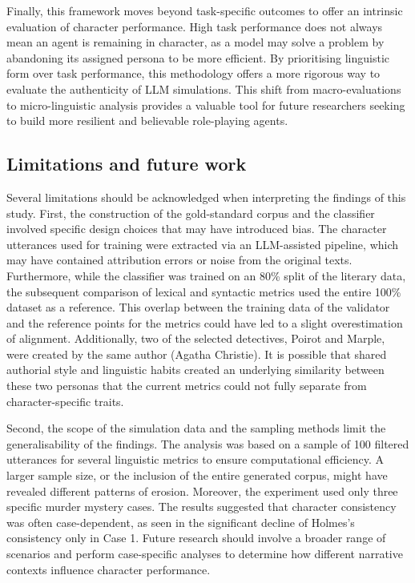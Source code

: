 \documentclass{article}
\begin{document}
Finally, this framework moves beyond task-specific outcomes to offer an intrinsic evaluation of character performance. High task performance does not always mean an agent is remaining in character, as a model may solve a problem by abandoning its assigned persona to be more efficient. By prioritising linguistic form over task performance, this methodology offers a more rigorous way to evaluate the authenticity of LLM simulations. This shift from macro-evaluations to micro-linguistic analysis provides a valuable tool for future researchers seeking to build more resilient and believable role-playing agents.

\subsection{Limitations and future work}

Several limitations should be acknowledged when interpreting the findings of this study. First, the construction of the gold-standard corpus and the classifier involved specific design choices that may have introduced bias. The character utterances used for training were extracted via an LLM-assisted pipeline, which may have contained attribution errors or noise from the original texts. Furthermore, while the classifier was trained on an 80\% split of the literary data, the subsequent comparison of lexical and syntactic metrics used the entire 100\% dataset as a reference. This overlap between the training data of the validator and the reference points for the metrics could have led to a slight overestimation of alignment. Additionally, two of the selected detectives, Poirot and Marple, were created by the same author (Agatha Christie). It is possible that shared authorial style and linguistic habits created an underlying similarity between these two personas that the current metrics could not fully separate from character-specific traits.

Second, the scope of the simulation data and the sampling methods limit the generalisability of the findings. The analysis was based on a sample of 100 filtered utterances for several linguistic metrics to ensure computational efficiency. A larger sample size, or the inclusion of the entire generated corpus, might have revealed different patterns of erosion. Moreover, the experiment used only three specific murder mystery cases. The results suggested that character consistency was often case-dependent, as seen in the significant decline of Holmes's consistency only in Case 1. Future research should involve a broader range of scenarios and perform case-specific analyses to determine how different narrative contexts influence character performance.
\end{document}
